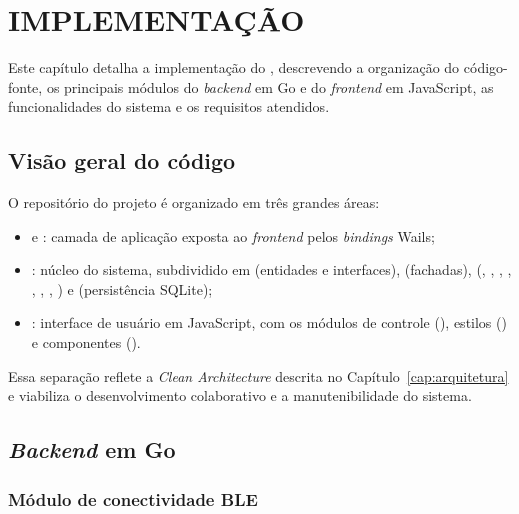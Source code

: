 
\chapter{IMPLEMENTAÇÃO}
\label{cap:implementacao}

Este capítulo detalha a implementação do \argus{}, descrevendo a organização do
código-fonte, os principais módulos do \textit{backend} em Go e do
\textit{frontend} em JavaScript, as funcionalidades do sistema e os requisitos
atendidos.

\section{Visão geral do código}
\label{sec:visao-geral-codigo}

O repositório do projeto é organizado em três grandes áreas:

\begin{itemize}
    \item {} e : camada de aplicação
        exposta ao \textit{frontend} pelos \textit{bindings} Wails;
    \item {}: núcleo do sistema, subdividido em 
        (entidades e interfaces),  (fachadas), 
        (, , , , ,
        , , ) e 
        (persistência SQLite);
    \item {}: interface de usuário em JavaScript, com os
        módulos de controle (), estilos () e
        componentes ().
\end{itemize}

Essa separação reflete a \textit{Clean Architecture} descrita no
Capítulo~\ref{cap:arquitetura} e viabiliza o desenvolvimento colaborativo e a
manutenibilidade do sistema.

\section{\textit{Backend} em Go}
\label{sec:backend}

\subsection{Módulo de conectividade BLE}
\label{sec:implementacao-ble}


